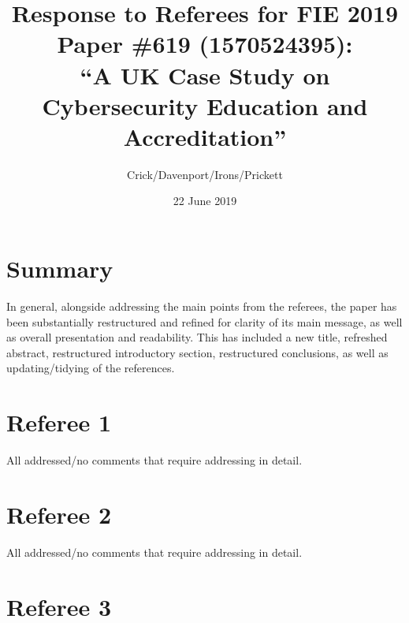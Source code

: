 \documentclass[a4paper,11pt]{article}
\begin{document}
\author{Crick/Davenport/Irons/Prickett}
\title{Response to Referees for FIE 2019 Paper \#619 (1570524395):\\``A
  UK Case Study on Cybersecurity Education and Accreditation''}
\date{22 June 2019}
\maketitle

\section*{Summary}

In general, alongside addressing the main points from the referees,
the paper has been substantially restructured and refined for clarity
of its main message, as well as overall presentation and
readability. This has included a new title, refreshed abstract,
restructured introductory section, restructured conclusions, as well
as updating/tidying of the references.

\section*{Referee 1}

All addressed/no comments that require addressing in detail.

\section*{Referee 2}

All addressed/no comments that require addressing in detail.

\section*{Referee 3}
\end{document}
